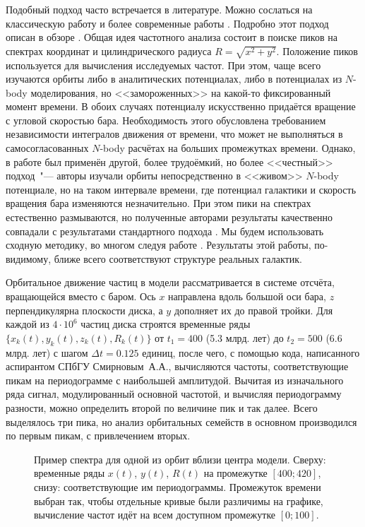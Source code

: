 \documentclass{trlnotes}
\begin{document}
Подобный подход часто встречается в литературе. Можно сослаться на классическую работу \citet{binney1982} и более
современные работы  \citep{athanassoula2002,portail2015,valluri2016}. Подробно этот подход описан в обзоре
\citet{athanassoula2013}. Общая идея частотного анализа состоит в поиске пиков на спектрах координат и цилиндрического
радиуса $R = \sqrt{x^2 + y^2}$. Положение пиков используется для  вычисления исследуемых частот.  При этом, чаще всего
изучаются орбиты либо в аналитических потенциалах, либо в потенциалах из $N$-body моделирования, но <<замороженных>> на
какой-то фиксированный момент времени. В обоих случаях потенциалу искусственно придаётся вращение с угловой скоростью
бара. Необходимость этого обусловлена требованием независимости интегралов движения от времени, что может не
выполняться в самосогласованных $N$-body расчётах на больших промежутках времени.  Однако, в
работе \citet{ceverino2007}
был применён другой, более трудоёмкий, но более <<честный>> подход~"--- авторы изучали орбиты непосредственно в
<<живом>> $N$-body потенциале, но на таком интервале времени, где потенциал галактики и скорость вращения бара
изменяются незначительно. При этом пики на спектрах естественно размываются, но полученные авторами результаты качественно совпадали с результатами стандартного подхода \citep{athanassoula2002a}.  Мы будем использовать сходную методику, во многом следуя работе \citet{gajda2016}. Результаты этой работы, по-видимому, ближе всего соответствуют структуре реальных галактик.

Орбитальное движение частиц в модели рассматривается в системе отсчёта, вращающейся вместо с баром. Ось $x$ направлена
вдоль большой оси бара, $z$ перпендикулярна плоскости диска, а $y$ дополняет их до правой тройки.  Для каждой из $4\cdot
10^6$ частиц диска строятся временные ряды $\{x_k(t), y_k(t), z_k(t), R_k(t)\}$ от $t_1=400$ (5.3 млрд. лет) до
$t_2=500$ (6.6 млрд. лет) с шагом $Δt = 0.125$ единиц, после чего, с помощью кода, написанного аспирантом СПбГУ
Смирновым~А.А., вычисляются частоты, соответствующие пикам на периодограмме с наибольшей амплитудой. Вычитая из
изначального ряда сигнал, модулированный основной частотой, и вычисляя периодограмму разности, можно определить второй по
величине пик и так далее. Всего выделялось три пика, но анализ орбитальных семейств в основном производился по первым
пикам, с привлечением вторых.

\begin{figure}[htpb]
  \centering
  \caption{Пример спектра для одной из орбит вблизи центра модели. Сверху: временные ряды $x(t)$, $y(t)$, $R(t)$ на промежутке
  $[400; 420]$, снизу: соответствующие им периодограммы. Промежуток времени выбран так, чтобы отдельные кривые были
  различимы на графике, вычисление частот идёт на всем доступном промежутке $[0;100]$.
  }%
  \label{fig:spectrasample}
\end{figure}
\end{document}

